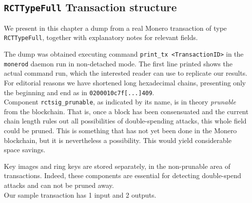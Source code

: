 

\begin{appendices}

\renewcommand{\theFancyVerbLine}{%
	\textcolor{red}{\small
		\arabic{FancyVerbLine}}}
	
	
\chapter{{\tt RCTTypeFull} Transaction structure}
\label{appendix:RCTTypeFull}

We present in this chapter a dump from a real Monero transaction of type {\tt RCTTypeFull}, 
together with explanatory notes for relevant fields.

The dump was obtained executing command {\tt print\_tx <TransactionID>} in the {\tt monerod} daemon 
run in non-detached mode.
The first line printed shows the actual command run, which the interested reader can use to replicate our results.
\\

For editorial reasons we have shortened long hexadecimal chains, presenting only the beginning and end
as in {\tt 0200010c7f[...]409}.
\\

Component {\tt rctsig\_prunable}, as indicated by its name, is in theory {\sl prunable} from the blockchain. 
That is, once a block  has been consensuated
and the current chain length rules out all possibilities of double-spending attacks, this whole field could be pruned.
This is something that has not yet been done in the Monero blockchain, but it is nevertheless a possibility.
This would yield considerable space savings. 

Key images and ring keys are stored separately, in the non-prunable area of transactions.
Indeed, these components are essential for detecting double-spend attacks and can not be pruned away.
\\

Our sample transaction has 1 input and 2 outputs.



\end{appendices}
